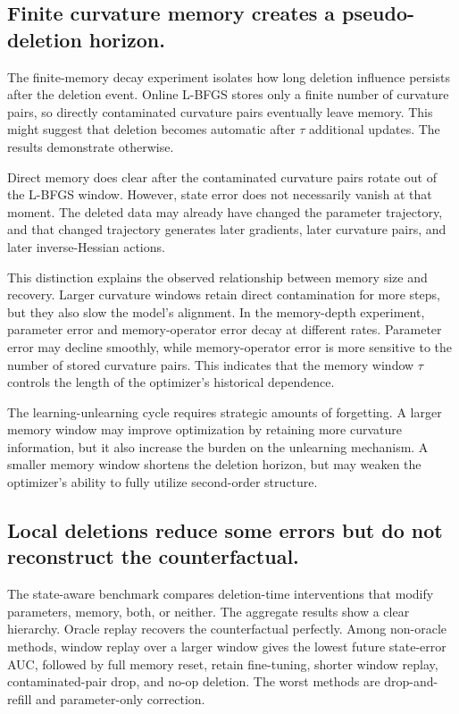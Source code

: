 \documentclass{ssl}
\begin{document}
\subsection{Finite curvature memory creates a pseudo-deletion horizon.}
The finite-memory decay experiment isolates how long deletion influence persists after the deletion event. Online L-BFGS stores only a finite number of curvature pairs, so directly contaminated curvature pairs eventually leave memory. This might suggest that deletion becomes automatic after $\tau$ additional updates. The results demonstrate otherwise.

Direct memory does clear after the contaminated curvature pairs rotate out of the L-BFGS window. However, state error does not necessarily vanish at that moment. The deleted data may already have changed the parameter trajectory, and that changed trajectory generates later gradients, later curvature pairs, and later inverse-Hessian actions.

This distinction explains the observed relationship between memory size and recovery. Larger curvature windows retain direct contamination for more steps, but they also slow the model's alignment. In the memory-depth experiment, parameter error and memory-operator error decay at different rates. Parameter error may decline smoothly, while memory-operator error is more sensitive to the number of stored curvature pairs. This indicates that the memory window $\tau$ controls the length of the optimizer's historical dependence.

The learning-unlearning cycle requires strategic amounts of forgetting. A larger memory window may improve optimization by retaining more curvature information, but it also increase the burden on the unlearning mechanism. A smaller memory window shortens the deletion horizon, but may weaken the optimizer's ability to fully utilize second-order structure. 

\subsection{Local deletions reduce some errors but do not reconstruct the counterfactual.}
The state-aware benchmark compares deletion-time interventions that modify parameters, memory, both, or neither. The aggregate results show a clear hierarchy. Oracle replay recovers the counterfactual perfectly. Among non-oracle methods, window replay over a larger window gives the lowest future state-error AUC, followed by full memory reset, retain fine-tuning, shorter window replay, contaminated-pair drop, and no-op deletion. The worst methods are drop-and-refill and parameter-only correction.
\end{document}
